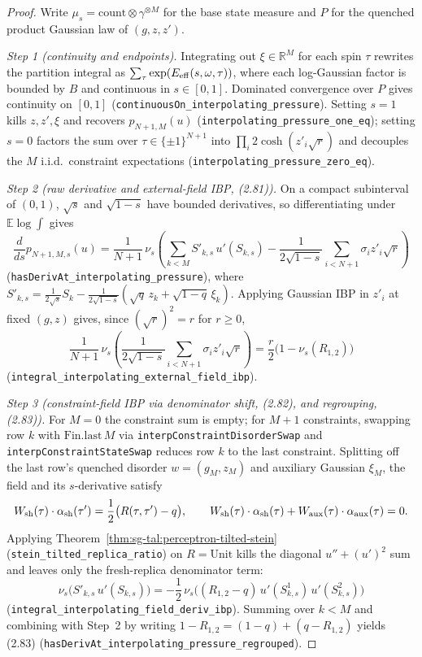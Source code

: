 \begin{proof}
  \leanok
Write $\mu_s=\mathrm{count}\otimes\gamma^{\otimes M}$ for the base state measure and $P$ for the
quenched product Gaussian law of $(g,z,z')$.

\emph{Step 1 (continuity and endpoints).} Integrating out $\xi\in\mathbb R^M$ for each spin $\tau$
rewrites the partition integral as $\sum_\tau\exp(E_{\rm eff}(s,\omega,\tau))$, where each log-Gaussian
factor is bounded by $B$ and continuous in $s\in[0,1]$. Dominated convergence over $P$ gives
continuity on $[0,1]$ (\texttt{continuousOn\_interpolating\_pressure}). Setting $s=1$ kills $z,z',\xi$
and recovers $p_{N+1,M}(u)$ (\texttt{interpolating\_pressure\_one\_eq}); setting $s=0$ factors the
sum over $\tau\in\{\pm 1\}^{N+1}$ into $\prod_i 2\cosh(z'_i\sqrt r)$ and decouples the $M$ i.i.d.~constraint expectations (\texttt{interpolating\_pressure\_zero\_eq}).

\emph{Step 2 (raw derivative and external-field IBP, (2.81)).} On a compact subinterval of $(0,1)$,
$\sqrt s$ and $\sqrt{1-s}$ have bounded derivatives, so differentiating under $\mathbb E\log\int$
gives
\[
 \frac{d}{ds}p_{N+1,M,s}(u)
 =\frac{1}{N+1}\,\nu_s\!\left(\sum_{k<M}S'_{k,s}\,u'(S_{k,s})
   -\frac{1}{2\sqrt{1-s}}\sum_{i<N+1}\sigma_i z'_i\sqrt r\right)
\]
(\texttt{hasDerivAt\_interpolating\_pressure}), where
$S'_{k,s}=\frac{1}{2\sqrt s}S_k-\frac{1}{2\sqrt{1-s}}(\sqrt q\,z_k+\sqrt{1-q}\,\xi_k)$. Applying
Gaussian IBP in $z'_i$ at fixed $(g,z)$ gives, since $(\sqrt r)^2=r$ for $r\ge 0$,
\[
 \frac{1}{N+1}\,\nu_s\!\left(\frac{1}{2\sqrt{1-s}}\sum_{i<N+1}\sigma_i z'_i\sqrt r\right)
 =\frac{r}{2}\bigl(1-\nu_s(R_{1,2})\bigr)
\]
(\texttt{integral\_interpolating\_external\_field\_ibp}).

\emph{Step 3 (constraint-field IBP via denominator shift, (2.82), and regrouping, (2.83)).} For
$M=0$ the constraint sum is empty; for $M+1$ constraints, swapping row $k$ with $\mathrm{Fin.last}\,M$
via \texttt{interpConstraintDisorderSwap} and \texttt{interpConstraintStateSwap} reduces row $k$ to
the last constraint. Splitting off the last row's quenched disorder $w=(g_M,z_M)$ and auxiliary
Gaussian $\xi_M$, the field and its $s$-derivative satisfy
\[
 W_{\rm sh}(\tau)\cdot\alpha_{\rm sh}(\tau')=\frac{1}{2}\bigl(R(\tau,\tau')-q\bigr),\qquad
 W_{\rm sh}(\tau)\cdot\alpha_{\rm sh}(\tau)+W_{\rm aux}(\tau)\cdot\alpha_{\rm aux}(\tau)=0.
\]
Applying Theorem~\ref{thm:sg-tal:perceptron-tilted-stein} (\texttt{stein\_tilted\_replica\_ratio}) on
$R=\mathrm{Unit}$ kills the diagonal $u''+(u')^2$ sum and leaves only the fresh-replica denominator
term:
\[
 \nu_s\bigl(S'_{k,s}\,u'(S_{k,s})\bigr)
 =-\frac{1}{2}\,\nu_s\bigl((R_{1,2}-q)\,u'(S_{k,s}^1)\,u'(S_{k,s}^2)\bigr)
\]
(\texttt{integral\_interpolating\_field\_deriv\_ibp}). Summing over $k<M$ and combining with Step~2
by writing $1-R_{1,2}=(1-q)+(q-R_{1,2})$ yields (2.83)
(\texttt{hasDerivAt\_interpolating\_pressure\_regrouped}).


\end{proof}
